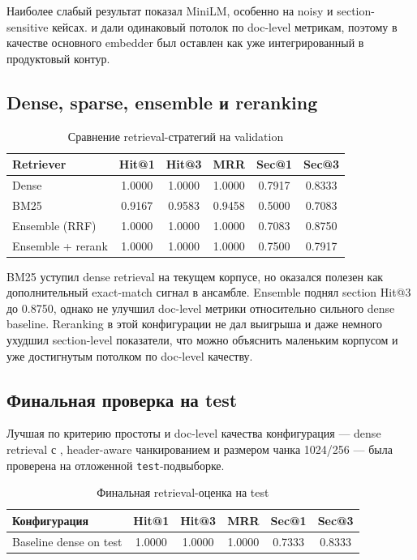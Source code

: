 \documentclass[12pt,a4paper]{article}
\begin{document}
Наиболее слабый результат показал MiniLM, особенно на noisy и section-sensitive кейсах.  и  дали одинаковый потолок по doc-level метрикам, поэтому в качестве основного embedder был оставлен  как уже интегрированный в продуктовый контур.

\subsection{Dense, sparse, ensemble и reranking}

\begin{table}[h]
\centering
\small
\begin{tabular}{lccccc}
\toprule
Retriever & Hit@1 & Hit@3 & MRR & Sec@1 & Sec@3 \\
\midrule
Dense & 1.0000 & 1.0000 & 1.0000 & 0.7917 & 0.8333 \\
BM25 & 0.9167 & 0.9583 & 0.9458 & 0.5000 & 0.7083 \\
Ensemble (RRF) & 1.0000 & 1.0000 & 1.0000 & 0.7083 & 0.8750 \\
Ensemble + rerank & 1.0000 & 1.0000 & 1.0000 & 0.7500 & 0.7917 \\
\bottomrule
\end{tabular}
\caption{Сравнение retrieval-стратегий на validation}
\end{table}

BM25 уступил dense retrieval на текущем корпусе, но оказался полезен как дополнительный exact-match сигнал в ансамбле. Ensemble поднял section Hit@3 до 0.8750, однако не улучшил doc-level метрики относительно сильного dense baseline. Reranking в этой конфигурации не дал выигрыша и даже немного ухудшил section-level показатели, что можно объяснить маленьким корпусом и уже достигнутым потолком по doc-level качеству.

\subsection{Финальная проверка на test}

Лучшая по критерию простоты и doc-level качества конфигурация --- dense retrieval с , header-aware чанкированием и размером чанка 1024/256 --- была проверена на отложенной \texttt{test}-подвыборке.

\begin{table}[h]
\centering
\small
\begin{tabular}{lccccc}
\toprule
Конфигурация & Hit@1 & Hit@3 & MRR & Sec@1 & Sec@3 \\
\midrule
Baseline dense on test & 1.0000 & 1.0000 & 1.0000 & 0.7333 & 0.8333 \\
\bottomrule
\end{tabular}
\caption{Финальная retrieval-оценка на test}
\end{table}
\end{document}
